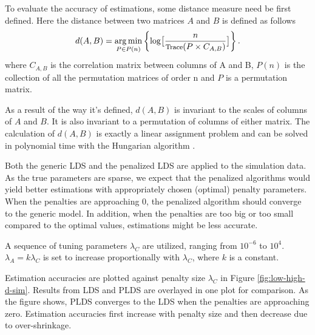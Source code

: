 \documentclass[fleqn]{article}
\let\oldref\ref
\renewcommand{\ref}[1]{(\oldref{#1})}
\DeclareMathOperator*{\argmin}{arg\,min}
\begin{document}
To evaluate the accuracy of estimations, some distance measure need be first defined. Here the distance between two matrices $A$ and $B$ is defined as follows
\begin{equation}\label{eq:distance}
d(A,B) = \argmin_{P\in P(n)}\left\{\log\bigl[\frac{n}{\text{\footnotesize Trace}(P\times C_{A,B})}\bigr]\right\}.
\end{equation}
where $C_{A,B}$ is the correlation matrix between columns of A and B, $P(n)$ is the collection of all the permutation matrices of order n and $P$ is a permutation matrix.

As a result of the way it's defined, $d(A,B)$ is invariant to the scales of columns of $A$ and $B$. It is also invariant to a permutation of columns of either matrix. The calculation of $d(A,B)$ is exactly a linear assignment problem and can be solved in polynomial time with the Hungarian algorithm \cite{kuhn1955hungarian}.


Both the generic LDS and the penalized LDS are applied to the simulation data. As the true parameters are sparse, we expect that the penalized algorithms would yield better estimations with appropriately chosen (optimal) penalty parameters. When the penalties are approaching 0, the penalized algorithm should converge to the generic model. In addition, when the penalties are too big or too small compared to the optimal values, estimations might be less accurate.

A sequence of tuning parameters $\lambda_C$ are utilized, ranging from $10^{-6}$ to $10^4$. $\lambda_A = k \lambda_C$ is set to increase proportionally with $\lambda_C$, where $k$ is a constant.

Estimation accuracies are plotted against penalty size $\lambda_C$ in Figure \oldref{fig:low-high-d-sim}. Results from LDS and PLDS are overlayed in one plot for comparison. As the figure shows, PLDS converges to the LDS when the penalties are approaching zero. Estimation accuracies first increase with penalty size and then decrease due to over-shrinkage.
\end{document}
